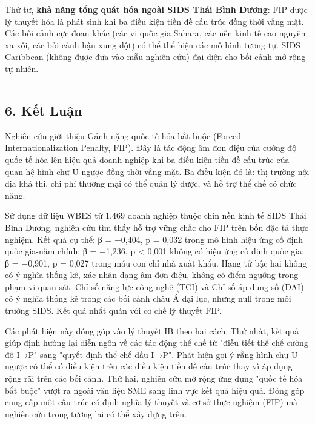 \documentclass[12pt,a4paper]{article}
\begin{document}
Thứ tư, \textbf{khả năng tổng quát hóa ngoài SIDS Thái Bình Dương}: FIP
được lý thuyết hóa là phát sinh khi ba điều kiện tiền đề cấu trúc đồng
thời vắng mặt. Các bối cảnh cực đoan khác (các vi quốc gia Sahara, các
nền kinh tế cao nguyên xa xôi, các bối cảnh hậu xung đột) có thể thể
hiện các mô hình tương tự. SIDS Caribbean (không được đưa vào mẫu nghiên
cứu) đại diện cho bối cảnh mở rộng tự nhiên.

\begin{center}\rule{0.5\linewidth}{0.5pt}\end{center}

\hypertarget{6-kux1ebft-luux1eadn}{%
\subsection{6. Kết Luận}\label{6-kux1ebft-luux1eadn}}

Nghiên cứu giới thiệu Gánh nặng quốc tế hóa bắt buộc (Forced
Internationalization Penalty, FIP). Đây là tác động âm đơn điệu của
cường độ quốc tế hóa lên hiệu quả doanh nghiệp khi ba điều kiện tiền đề
cấu trúc của quan hệ hình chữ U ngược đồng thời vắng mặt. Ba điều kiện
đó là: thị trường nội địa khả thi, chi phí thương mại có thể quản lý
được, và hỗ trợ thể chế có chức năng.

Sử dụng dữ liệu WBES từ 1.469 doanh nghiệp thuộc chín nền kinh tế SIDS
Thái Bình Dương, nghiên cứu tìm thấy hỗ trợ vững chắc cho FIP trên bốn
đặc tả thực nghiệm. Kết quả cụ thể: β = −0,404, p = 0,032 trong mô hình
hiệu ứng cố định quốc gia-năm chính; β = −1,236, p \textless{} 0,001
không có hiệu ứng cố định quốc gia; β = −0,901, p = 0,027 trong mẫu con
chỉ nhà xuất khẩu. Hạng tử bậc hai không có ý nghĩa thống kê, xác nhận
dạng âm đơn điệu, không có điểm ngưỡng trong phạm vi quan sát. Chỉ số
năng lực công nghệ (TCI) và Chỉ số áp dụng số (DAI) có ý nghĩa thống kê
trong các bối cảnh châu Á đại lục, nhưng null trong môi trường SIDS. Kết
quả nhất quán với cơ chế lý thuyết FIP.

Các phát hiện này đóng góp vào lý thuyết IB theo hai cách. Thứ nhất, kết
quả giúp định hướng lại diễn ngôn về các tác động thể chế từ "điều tiết
thể chế cường độ I→P" sang "quyết định thể chế dấu I→P". Phát hiện gợi ý
rằng hình chữ U ngược có thể có điều kiện trên các điều kiện tiền đề cấu
trúc thay vì áp dụng rộng rãi trên các bối cảnh. Thứ hai, nghiên cứu mở
rộng ứng dụng "quốc tế hóa bắt buộc" vượt ra ngoài văn liệu SME sang
lĩnh vực kết quả hiệu quả. Đóng góp cung cấp một cấu trúc có định nghĩa
lý thuyết và cơ sở thực nghiệm (FIP) mà nghiên cứu trong tương lai có
thể xây dựng trên.
\end{document}
